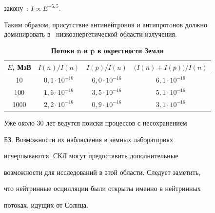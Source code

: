  закону~\cite{mol6}: \mbox{$I \propto E^{- 5,5}$}. 

 Таким образом, присутствие  антинейтронов и антипротонов должно доминировать в~ низкоэнергетической области излучения.

 

 {\small

\begin{table}[h!] \centering

\caption*{\bf Потоки $\boldsymbol{\bar  n}$ и $\boldsymbol{\bar  p}$  в окрестности Земли} \vspace{-3mm}

\begin{tabular}{c|c|c|c} \hline

\footnotesize $E$, МэВ  & \footnotesize $I(\bar  n)/I(n)$  &\footnotesize $ I( \bar  p)/I(n)$  &\footnotesize $\big(I(\bar  n) + I(\bar  p)\big)/I(n)$ \\ \hline

\rule{0mm}{14pt}%

 10        & $  0,1 \cdot 10^{- 16}$  & $ 6,0 \cdot 10^{- 16} $  & $ 6,1 \cdot 10^{- 16}$ \\

 100     &  $1,6 \cdot 10^{- 16}$  &  $3,5 \cdot 10^{- 16} $ &  $5,1 \cdot 10^{- 16}$ \\

 1000    &  $2,2 \cdot 10^{- 16}$  & $ 0,9 \cdot 10^{- 16}$  & $ 3,1 \cdot 10^{- 16}$ \\

 \hline

\end{tabular}

\end{table}

}



\smallskip


 Уже около 30 лет ведутся поиски процессов с несохранением

 БЗ. Возможности их наблюдения в земных лабораториях

 исчерпываются. СКЛ могут предоставить дополнительные

 возможности для исследований в этой области. Следует заметить,

 что нейтринные осцилляции были открыты именно в нейтринных

 потоках, идущих от Солнца.



